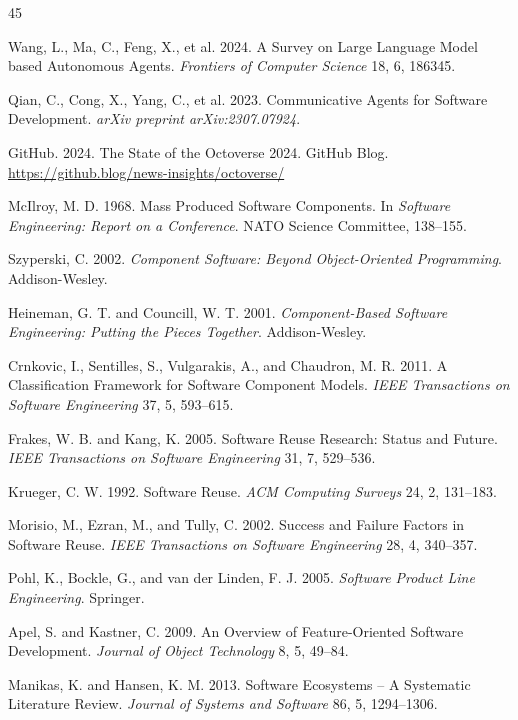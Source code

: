 \documentclass[sigconf,review,anonymous,nonacm]{acmart}
\begin{document}
\begin{thebibliography}{45}

Wang, L., Ma, C., Feng, X., et al. 2024. A Survey on Large Language Model based Autonomous Agents. \textit{Frontiers of Computer Science} 18, 6, 186345.

Qian, C., Cong, X., Yang, C., et al. 2023. Communicative Agents for Software Development. \textit{arXiv preprint arXiv:2307.07924}.

GitHub. 2024. The State of the Octoverse 2024. GitHub Blog. \url{https://github.blog/news-insights/octoverse/}

McIlroy, M. D. 1968. Mass Produced Software Components. In \textit{Software Engineering: Report on a Conference}. NATO Science Committee, 138--155.

Szyperski, C. 2002. \textit{Component Software: Beyond Object-Oriented Programming}. Addison-Wesley.

Heineman, G. T. and Councill, W. T. 2001. \textit{Component-Based Software Engineering: Putting the Pieces Together}. Addison-Wesley.

Crnkovic, I., Sentilles, S., Vulgarakis, A., and Chaudron, M. R. 2011. A Classification Framework for Software Component Models. \textit{IEEE Transactions on Software Engineering} 37, 5, 593--615.

Frakes, W. B. and Kang, K. 2005. Software Reuse Research: Status and Future. \textit{IEEE Transactions on Software Engineering} 31, 7, 529--536.

Krueger, C. W. 1992. Software Reuse. \textit{ACM Computing Surveys} 24, 2, 131--183.

Morisio, M., Ezran, M., and Tully, C. 2002. Success and Failure Factors in Software Reuse. \textit{IEEE Transactions on Software Engineering} 28, 4, 340--357.

Pohl, K., Bockle, G., and van der Linden, F. J. 2005. \textit{Software Product Line Engineering}. Springer.

Apel, S. and Kastner, C. 2009. An Overview of Feature-Oriented Software Development. \textit{Journal of Object Technology} 8, 5, 49--84.

Manikas, K. and Hansen, K. M. 2013. Software Ecosystems -- A Systematic Literature Review. \textit{Journal of Systems and Software} 86, 5, 1294--1306.


\end{thebibliography}
\end{document}

